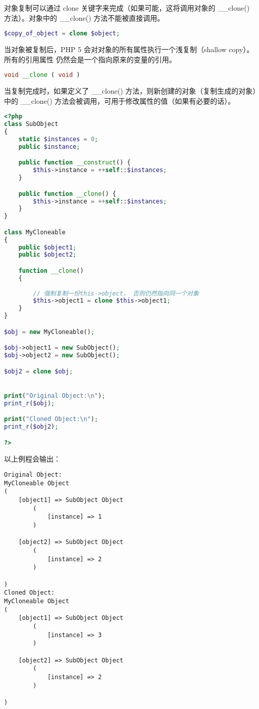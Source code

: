 对象复制可以通过 clone 关键字来完成（如果可能，这将调用对象的 \_\_clone() 方法）。对象中的 \_\_clone() 方法不能被直接调用。

\begin{lstlisting}[language=PHP]
$copy_of_object = clone $object;
\end{lstlisting}

当对象被复制后，PHP 5 会对对象的所有属性执行一个浅复制（shallow copy）。所有的引用属性 仍然会是一个指向原来的变量的引用。






\begin{lstlisting}[language=PHP]
void __clone ( void )
\end{lstlisting}

当复制完成时，如果定义了 \_\_clone() 方法，则新创建的对象（复制生成的对象）中的 \_\_clone() 方法会被调用，可用于修改属性的值（如果有必要的话）。

\begin{lstlisting}[language=PHP]
<?php
class SubObject
{
    static $instances = 0;
    public $instance;

    public function __construct() {
        $this->instance = ++self::$instances;
    }

    public function __clone() {
        $this->instance = ++self::$instances;
    }
}

class MyCloneable
{
    public $object1;
    public $object2;

    function __clone()
    {
      
        // 强制复制一份this->object， 否则仍然指向同一个对象
        $this->object1 = clone $this->object1;
    }
}

$obj = new MyCloneable();

$obj->object1 = new SubObject();
$obj->object2 = new SubObject();

$obj2 = clone $obj;


print("Original Object:\n");
print_r($obj);

print("Cloned Object:\n");
print_r($obj2);

?>
\end{lstlisting}

以上例程会输出：

\begin{verbatim}
Original Object:
MyCloneable Object
(
    [object1] => SubObject Object
        (
            [instance] => 1
        )

    [object2] => SubObject Object
        (
            [instance] => 2
        )

)
Cloned Object:
MyCloneable Object
(
    [object1] => SubObject Object
        (
            [instance] => 3
        )

    [object2] => SubObject Object
        (
            [instance] => 2
        )

)
\end{verbatim}


